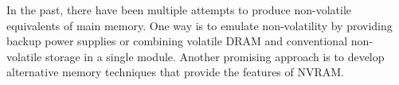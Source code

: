 In the past, there have been multiple attempts to produce non-volatile
equivalents of main memory. One way is to emulate non-volatility by providing
backup power supplies or combining volatile DRAM and conventional non-volatile
storage in a single module. Another promising approach is to develop alternative
memory techniques that provide the features of NVRAM.



%
%
%
%
%

